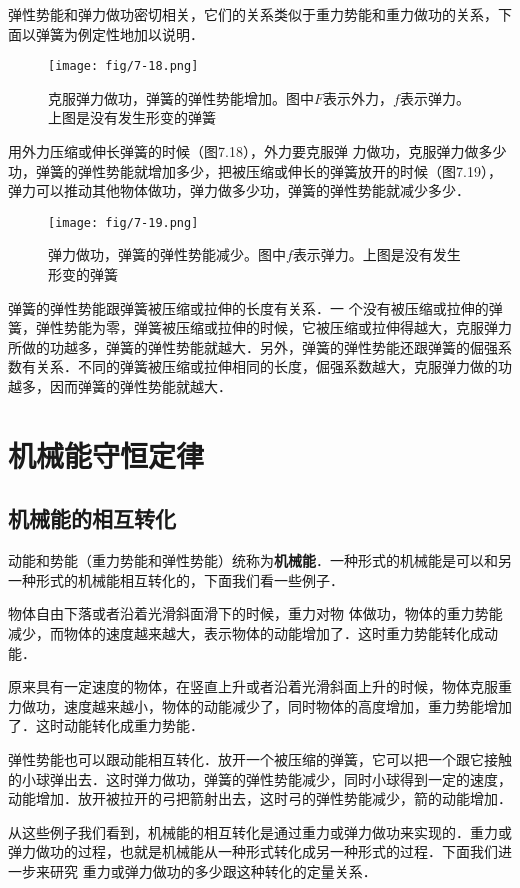 弹性势能和弹力做功密切相关，它们的关系类似于重力势能和重力做功的关系，下面以弹簧为例定性地加以说明．

\begin{figure}[htp]
\centering\texttt{[image: fig/7-18.png]}
\caption{克服弹力做功，弹簧的弹性势能增加。图中$F$表示外力，$f$表示弹力。上图是没有发生形变的弹簧}
\end{figure}
用外力压缩或伸长弹簧的时候（图7.18），外力要克服弹
力做功，克服弹力做多少功，弹簧的弹性势能就增加多少，把被压缩或伸长的弹簧放开的时候（图7.19），弹力可以推动其他物体做功，弹力做多少功，弹簧的弹性势能就减少多少．
\begin{figure}[htp]
\centering\texttt{[image: fig/7-19.png]}
\caption{弹力做功，弹簧的弹性势能减少。图中$f$表示弹力。上图是没有发生形变的弹簧}
\end{figure}

弹簧的弹性势能跟弹簧被压缩或拉伸的长度有关系．一
个没有被压缩或拉伸的弹簧，弹性势能为零，弹簧被压缩或拉伸的时候，它被压缩或拉伸得越大，克服弹力所做的功越多，弹簧的弹性势能就越大．另外，弹簧的弹性势能还跟弹簧的倔强系数有关系．不同的弹簧被压缩或拉伸相同的长度，倔强系数越大，克服弹力做的功越多，因而弹簧的弹性势能就越大．

\section{机械能守恒定律}
\subsection{机械能的相互转化}

动能和势能（重力势能和弹性势能）统称为\textbf{机械能}．一种形式的机械能是可以和另一种形式的机械能相互转化的，下面我们看一些例子．

物体自由下落或者沿着光滑斜面滑下的时候，重力对物
体做功，物体的重力势能减少，而物体的速度越来越大，表示物体的动能增加了．这时重力势能转化成动能．

原来具有一定速度的物体，在竖直上升或者沿着光滑斜面上升的时候，物体克服重力做功，速度越来越小，物体的动能减少了，同时物体的高度增加，重力势能增加了．这时动能转化成重力势能．

弹性势能也可以跟动能相互转化．放开一个被压缩的弹簧，它可以把一个跟它接触的小球弹出去．这时弹力做功，弹簧的弹性势能减少，同时小球得到一定的速度，动能增加．放开被拉开的弓把箭射出去，这时弓的弹性势能减少，箭的动能增加．

从这些例子我们看到，机械能的相互转化是通过重力或弹力做功来实现的．重力或弹力做功的过程，也就是机械能从一种形式转化成另一种形式的过程．下面我们进一步来研究
重力或弹力做功的多少跟这种转化的定量关系．
	
